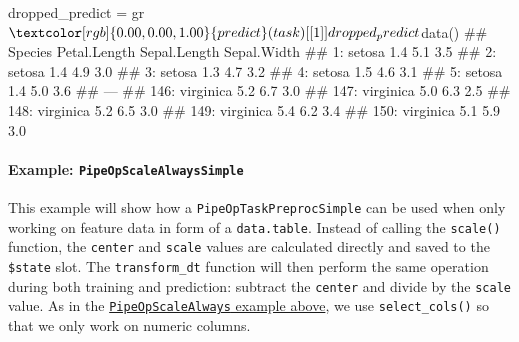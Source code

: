\documentclass[]{article}
\newenvironment{Shaded}{}{}
\newcommand{\DecValTok}[1]{#1}
\newcommand{\KeywordTok}[1]{\textcolor[rgb]{0.00,0.00,1.00}{#1}}
\newcommand{\NormalTok}[1]{#1}
\newcommand{\OperatorTok}[1]{#1}
\newcommand{\StringTok}[1]{\textcolor[rgb]{0.00,0.50,0.50}{#1}}
\let\oldparagraph\paragraph
\renewcommand{\paragraph}[1]{\oldparagraph{#1}\mbox{}}
\renewenvironment{Shaded} {\begin{snugshade}\small} {\end{snugshade}}
\begin{document}
\begin{Shaded}
\begin{Highlighting}[]
\NormalTok{dropped_predict =}\StringTok{ }\NormalTok{gr}\OperatorTok{$}\KeywordTok{predict}\NormalTok{(task)[[}\DecValTok{1}\NormalTok{]]}

\NormalTok{dropped_predict}\OperatorTok{$}\KeywordTok{data}\NormalTok{()}
\NormalTok{##        Species Petal.Length Sepal.Length Sepal.Width}
\NormalTok{##   1:    setosa          1.4          5.1         3.5}
\NormalTok{##   2:    setosa          1.4          4.9         3.0}
\NormalTok{##   3:    setosa          1.3          4.7         3.2}
\NormalTok{##   4:    setosa          1.5          4.6         3.1}
\NormalTok{##   5:    setosa          1.4          5.0         3.6}
\NormalTok{##  ---                                                }
\NormalTok{## 146: virginica          5.2          6.7         3.0}
\NormalTok{## 147: virginica          5.0          6.3         2.5}
\NormalTok{## 148: virginica          5.2          6.5         3.0}
\NormalTok{## 149: virginica          5.4          6.2         3.4}
\NormalTok{## 150: virginica          5.1          5.9         3.0}
\end{Highlighting}
\end{Shaded}

\hypertarget{example-pipeopscalealwayssimple}{%
\paragraph{\texorpdfstring{Example: \texttt{PipeOpScaleAlwaysSimple}}{Example: PipeOpScaleAlwaysSimple}}\label{example-pipeopscalealwayssimple}}

This example will show how a \texttt{PipeOpTaskPreprocSimple} can be used when only working on feature data in form of a \texttt{data.table}.
Instead of calling the \texttt{scale()} function, the \texttt{center} and \texttt{scale} values are calculated directly and saved to the \texttt{\$state} slot.
The \texttt{transform\_dt} function will then perform the same operation during both training and prediction: subtract the \texttt{center} and divide by the \texttt{scale} value.
As in the \protect\hyperlink{example-pipeopscalealways}{\texttt{PipeOpScaleAlways} example above}, we use \texttt{select\_cols()} so that we only work on numeric columns.
\end{document}
